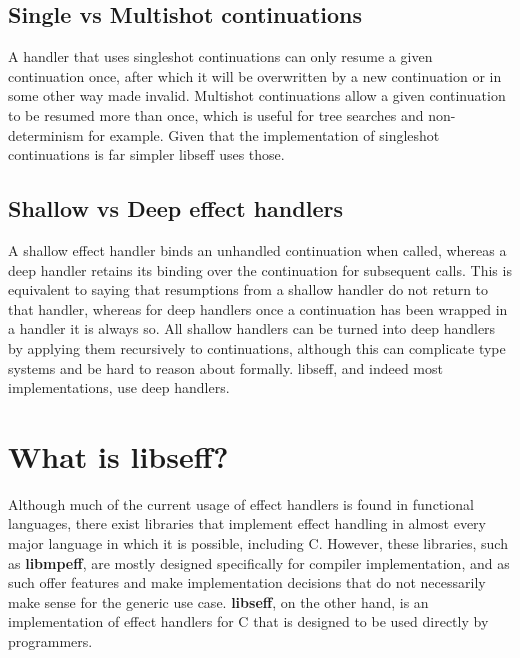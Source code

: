 \documentclass[logo,bsc,singlespacing,parskip,online]{infthesis}
\begin{document}
\subsection{Single vs Multishot continuations}

A handler that uses singleshot continuations can only resume a given continuation once, after which it will be overwritten by a new continuation or in some other way made invalid. Multishot continuations allow a given continuation to be resumed more than once, which is useful for tree searches and non-determinism for example. Given that the implementation of singleshot continuations is far simpler libseff uses those.

\subsection{Shallow vs Deep effect handlers}

A shallow effect handler binds an unhandled continuation when called, whereas a deep handler retains its binding over the continuation for subsequent calls. This is equivalent to saying that resumptions from a shallow handler do not return to that handler, whereas for deep handlers once a continuation has been wrapped in a handler it is always so. All shallow handlers can be turned into deep handlers by applying them recursively to continuations, although this can complicate type systems and be hard to reason about formally. libseff, and indeed most implementations, use deep handlers.

\section{What is libseff?}

Although much of the current usage of effect handlers is found in functional languages, there exist libraries that implement effect handling in almost every major language in which it is possible, including C. However, these libraries, such as \textbf{libmpeff}, are mostly designed specifically for compiler implementation, and as such offer features and make implementation decisions that do not necessarily make sense for the generic use case.\citep{libmprompt} \textbf{libseff}, on the other hand, is an implementation of effect handlers for C that is designed to be used directly by programmers.\citep{libseff_paper}
\end{document}
